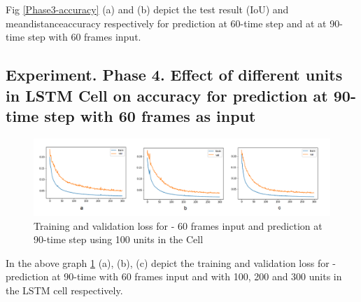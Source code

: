 Fig \ref{Phase3-accuracy} (a) and (b) depict the test result (IoU) and mean\textunderscore distance\textunderscore accuracy respectively for prediction at 60-time step and at at 90-time step with 60 frames input. 





\subsection{Experiment. Phase 4. Effect of different units in LSTM Cell on accuracy for prediction at 90-time step with 60 frames as input}

\begin{figure}[H] 
\includegraphics[scale=0.6]{Phase4-training}
\begin{center}
\caption{Training and validation loss for - 60 frames input and prediction at 90-time step using 100 units in the Cell}
\label{fig:Phase4-training}
\end{center}
\end{figure}


In the above graph \ref{fig:Phase4-training} (a), (b), (c) depict the training and validation loss for - prediction at 90-time with 60 frames input and with 100, 200 and 300 units in the LSTM cell respectively. \\

